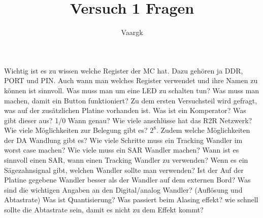 \documentclass[12pt]{article}
\title{Versuch 1 Fragen}
\author{
        Vaargk
}
\begin{document}
\maketitle
Wichtig ist es zu wissen welche Register der MC hat. Dazu gehören ja DDR, PORT und PIN. Auch wann man welches Register verwendet und ihre Namen zu können ist sinnvoll. Was muss man um eine LED zu schalten tun? Was muss man machen, damit ein Button funktioniert?
Zu dem ersten Versuchsteil wird gefragt, was auf der zusätzlichen Platine vorhanden ist. Was ist ein Komperator? Was gibt dieser aus? 1/0 Wann genau? Wie viele anschlüsse hat das R2R Netzwerk? Wie viele Möglichkeiten zur Belegung gibt es? $2^8$. Zudem welche Möglichkeiten der DA Wandlung gibt es? Wie viele Schritte muss ein Tracking Wandler im worst case machen? Wie viele muss ein SAR Wandler machen? Wann ist es sinnvoll einen SAR, wann einen Tracking Wandler zu verwenden? Wenn es ein Sägezahnsignal gibt, welchen Wandler sollte man verwenden? Ist der Auf der Platine gegebene Wandler besser als der Wandler auf dem externen Bord? Was sind die wichtigen Angaben an den Digital/analog Wandler? (Auflösung und Abtastrate) Was ist Quantisierung? Was passiert beim Alasing effekt? wie schnell sollte die Abtastrate sein, damit es nicht zu dem Effekt kommt?
\end{document}
